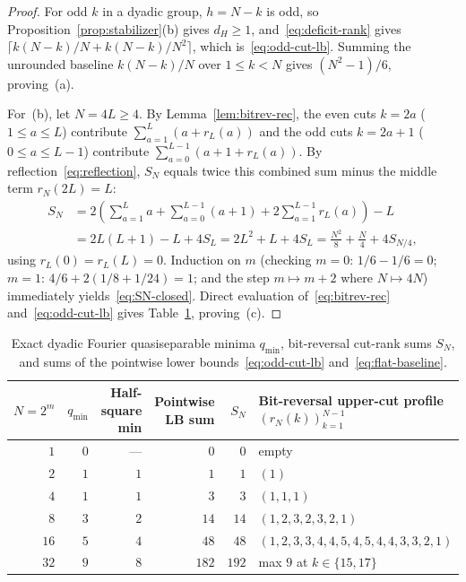 \documentclass[11pt,reqno]{amsart}
\numberwithin{equation}{section}
\theoremstyle{definition}
\theoremstyle{remark}
\begin{document}
\begin{proof}
For odd $k$ in a dyadic group, $h=N-k$ is odd, so Proposition~\ref{prop:stabilizer}(b) gives $d_H\ge 1$, and~\eqref{eq:deficit-rank} gives $\lceil k(N-k)/N + k(N-k)/N^2\rceil$, which is~\eqref{eq:odd-cut-lb}. Summing the unrounded baseline $k(N-k)/N$ over $1\le k<N$ gives $(N^2-1)/6$, proving~(a).

For~(b), let $N=4L\ge 4$. By Lemma~\ref{lem:bitrev-rec}, the even cuts $k=2a$ ($1\le a\le L$) contribute $\sum_{a=1}^L(a + r_L(a))$ and the odd cuts $k=2a+1$ ($0\le a\le L-1$) contribute $\sum_{a=0}^{L-1}(a+1+r_L(a))$. By reflection~\eqref{eq:reflection}, $S_N$ equals twice this combined sum minus the middle term $r_N(2L)=L$:
\begin{align*}
S_N &= 2\left(\sum_{a=1}^L a + \sum_{a=0}^{L-1}(a+1) + 2\sum_{a=1}^{L-1} r_L(a)\right) - L\\
&= 2L(L+1) - L + 4S_L = 2L^2 + L + 4S_L = \frac{N^2}{8} + \frac{N}{4} + 4S_{N/4},
\end{align*}
using $r_L(0)=r_L(L)=0$. Induction on $m$ (checking $m=0$: $1/6-1/6=0$; $m=1$: $4/6 + 2(1/8+1/24)=1$; and the step $m\mapsto m+2$ where $N\mapsto 4N$) immediately yields~\eqref{eq:SN-closed}. Direct evaluation of~\eqref{eq:bitrev-rec} and~\eqref{eq:odd-cut-lb} gives Table~\ref{tab:profiles}, proving~(c).
\end{proof}

\begin{table}[ht]
\centering
\caption{Exact dyadic Fourier quasiseparable minima $q_{\min}$, bit-reversal cut-rank sums $S_N$, and sums of the pointwise lower bounds~\eqref{eq:odd-cut-lb} and~\eqref{eq:flat-baseline}.}
\label{tab:profiles}
\begin{tabular}{rrrrrl}
\toprule
$N=2^m$ & $q_{\min}$ & Half-square min & Pointwise LB sum & $S_N$ & Bit-reversal upper-cut profile $(r_N(k))_{k=1}^{N-1}$ \\
\midrule
$1$ & $0$ & --- & $0$ & $0$ & empty \\
$2$ & $1$ & $1$ & $1$ & $1$ & $(1)$ \\
$4$ & $1$ & $1$ & $3$ & $3$ & $(1,1,1)$ \\
$8$ & $3$ & $2$ & $14$ & $14$ & $(1,2,3,2,3,2,1)$ \\
$16$ & $5$ & $4$ & $48$ & $48$ & $(1,2,3,3,4,4,5,4,5,4,4,3,3,2,1)$ \\
$32$ & $9$ & $8$ & $182$ & $192$ & max $9$ at $k\in\{15,17\}$ \\
\bottomrule
\end{tabular}
\end{table}
\end{document}
